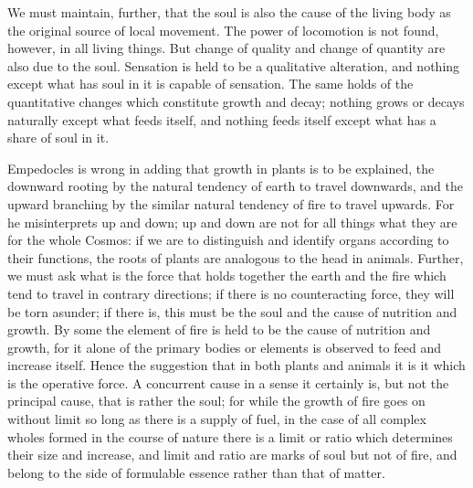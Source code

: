 We must maintain, further, that the soul is also the cause of the
living body as the original source of local movement. The power of
locomotion is not found, however, in all living things. But change
of quality and change of quantity are also due to the soul. Sensation
is held to be a qualitative alteration, and nothing except what has
soul in it is capable of sensation. The same holds of the quantitative
changes which constitute growth and decay; nothing grows or decays
naturally except what feeds itself, and nothing feeds itself except
what has a share of soul in it. 

Empedocles is wrong in adding that growth in plants is to be explained,
the downward rooting by the natural tendency of earth to travel downwards,
and the upward branching by the similar natural tendency of fire to
travel upwards. For he misinterprets up and down; up and down are
not for all things what they are for the whole Cosmos: if we are to
distinguish and identify organs according to their functions, the
roots of plants are analogous to the head in animals. Further, we
must ask what is the force that holds together the earth and the fire
which tend to travel in contrary directions; if there is no counteracting
force, they will be torn asunder; if there is, this must be the soul
and the cause of nutrition and growth. By some the element of fire
is held to be the cause of nutrition and growth, for it alone of the
primary bodies or elements is observed to feed and increase itself.
Hence the suggestion that in both plants and animals it is it which
is the operative force. A concurrent cause in a sense it certainly
is, but not the principal cause, that is rather the soul; for while
the growth of fire goes on without limit so long as there is a supply
of fuel, in the case of all complex wholes formed in the course of
nature there is a limit or ratio which determines their size and increase,
and limit and ratio are marks of soul but not of fire, and belong
to the side of formulable essence rather than that of matter.

